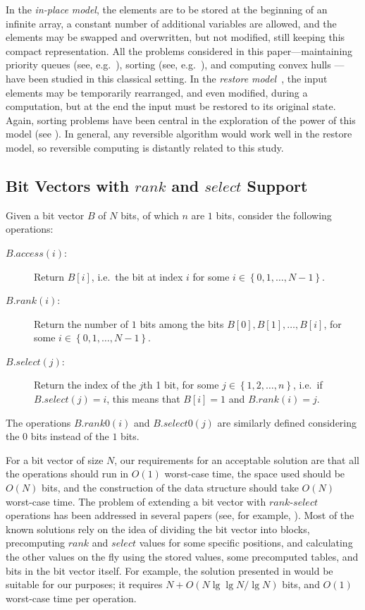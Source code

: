 \documentclass[final,onetabnum,onefignum,onethmnum]{siamltex}
\newcommand{\set}[1]{\left\{#1\right\}}
\newcommand{\Access}{\mbox{$\mathit{access}$}}
\newcommand{\Rank}{\mbox{$\mathit{rank}$}}
\newcommand{\Select}{\mbox{$\mathit{select}$}}
\begin{document}
In the \emph{in-place model}, the elements are to be stored at the
beginning of an infinite array, a constant number of additional
variables are allowed, and the elements may be swapped and
overwritten, but not modified, still keeping this compact
representation.  All the problems considered in this
paper---maintaining priority queues (see,
e.g.~\cite{CMP88,EEK15,Wil64}), sorting (see,
e.g.~\cite{EEK15,KPT96,Wil64}), and computing convex hulls
\cite{BIKMMT04}---have been studied in this classical setting.  In the
\emph{restore model}~\cite{CMR14}, the input elements may be
temporarily rearranged, and even modified, during a computation, but
at the end the input must be restored to its original state. Again,
sorting problems have been central in the exploration of the power of
this model (see \cite{CMR14,KP94}). In general, any reversible
algorithm would work well in the restore model, so reversible
computing is distantly related to this study.

\subsection{Bit Vectors with \Rank{} and \Select{} Support}
Given a bit vector $B$ of $N$ bits, of which $n$ are $1$ bits, consider the
following operations:

\begin{description}
\item[$B.\Access(i)$:] Return $B[i]$, i.e.~the bit at index $i$ for
  some $i \in\set{0,1,\ldots,N-1}$.
\item[$B.\Rank(i)$:] Return the number of $1$ bits among the bits
  $B[0], B[1],\ldots, B[i]$, for some $i \in\set{0,1,\ldots,N-1}$.
\item[$B.\Select(j)$:] Return the index of the $j$th 1 bit, for some $j \in\set{1,2,\ldots,n}$, i.e.~if
  $B.\Select(j) = i$, this means that $B[i]=1$ and $B.\Rank(i) =
  j$. 
\end{description}
The operations $B.\Rank\mbox{0}(i)$ and $B.\Select\mbox{0}(j)$ are
similarly defined considering the $0$ bits instead of the $1$ bits.

For a bit vector of size $N$, our requirements for an acceptable
solution are that all the operations should run in
$O(1)$ worst-case time, the space used should be $O(N)$ bits,
and the construction of the data structure should take $O(N)$
worst-case time.  The problem of extending a bit vector with
\Rank{}-\Select{} operations has been addressed in several papers
(see, for example, \cite{Jac89,Mun96,RRR07}).  Most of the known
solutions rely on the idea of dividing the bit vector into blocks,
precomputing \Rank{} and \Select{} values for some specific
positions, and calculating the other values on the fly using the
stored values, some precomputed tables, and bits in the bit vector
itself.  For example, the solution presented in \cite{RRR07} would be
suitable for our purposes; it requires $N + O(N\lg\lg N/\lg N)$
bits, and $O(1)$ worst-case time per operation.
\end{document}
